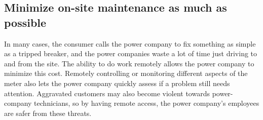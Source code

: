 \subsection{Minimize on-site maintenance as much as possible}
In many cases, the consumer calls the power company to fix something as simple as a tripped breaker, and the power companies waste a lot of time just driving to and from the site. The ability to do work remotely allows the power company to minimize this cost. Remotely controlling or monitoring different aspects of the meter also lets the power company quickly assess if a problem still needs attention. Aggravated customers may also become violent towards power-company technicians, so by having remote access, the power company's employees are safer from these threats.